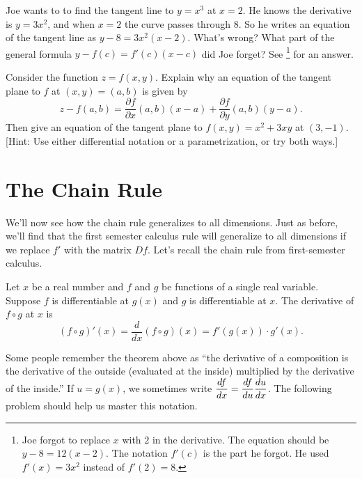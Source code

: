 \begin{review*}
 Joe wants to to find the tangent line to $y=x^3$ at $x=2$.  He knows the derivative is $y=3x^2$, and when $x=2$ the curve passes through $8$.  So he writes an equation of the tangent line as $y-8=3x^2(x-2)$.  What's wrong?  What part of the general formula $y-f(c) = f'(c) (x-c)$ did Joe forget?  See \footnote{Joe forgot to replace $x$ with $2$ in the derivative. The equation should be $y-8=12(x-2)$.  The notation $f'(c)$ is the part he forgot.  He used $f'(x)=3x^2$ instead of $f'(2)=8$.} for an answer.
\end{review*}

\begin{problem}
 Consider the function $z=f(x,y)$. Explain why an equation of the tangent plane to $f$ at $(x,y)=(a,b)$ is given by  
$$z-f(a,b) = \frac{\partial f}{\partial x}(a,b) (x-a) +  \frac{\partial f}{\partial y}(a,b) (y-a).$$
Then give an equation of the tangent plane to $f(x,y) = x^2+3xy$ at $(3,-1)$. 
[Hint: Use either differential notation or a parametrization, or try both ways.]
\end{problem}


\section{The Chain Rule}

We'll now see how the chain rule generalizes to all dimensions.  Just as before, we'll find that the first semester calculus rule will generalize to all dimensions if we replace $f'$ with the matrix $Df$. 
Let's recall the chain rule from first-semester calculus. 

\begin{theorem}
 Let $x$ be a real number and $f$ and $g$ be functions of a single real variable. Suppose $f$ is differentiable at $g(x)$ and $g$ is differentiable at $x$. The derivative of $f\circ g$ at $x$ is 
$$(f\circ g)'(x) = \frac{d}{dx}(f\circ g)(x) = f'(g(x))\cdot g'(x).$$
\end{theorem}

Some people remember the theorem above as ``the derivative of a composition is the derivative of the outside (evaluated at the inside) multiplied by the derivative of the inside.'' If $u=g(x)$, we sometimes write $\displaystyle \frac{df}{dx}=\frac{df}{du}\frac{du}{dx}$. The following problem should help us master this notation.

